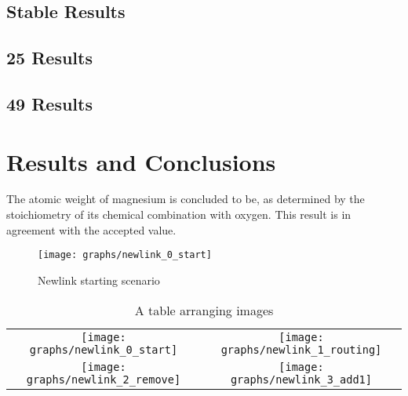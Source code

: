 \documentclass{article}
\begin{document}
\subsection{Stable Results}
\subsection{25 Results}
\subsection{49 Results}


\section{Results and Conclusions}

The atomic weight of magnesium is concluded to be, as determined by the stoichiometry of its chemical combination with oxygen. This result is in agreement with the accepted value.

\begin{figure}[htbp]
\begin{center}
\texttt{[image: graphs/newlink\_0\_start]} %
\caption{Newlink starting scenario}
\end{center}
\end{figure}

\begin{table}[ht]
\caption{A table arranging  images}
\centering
\begin{tabular}{cc}
\texttt{[image: graphs/newlink\_0\_start]}&\texttt{[image: graphs/newlink\_1\_routing]}\\
 
\texttt{[image: graphs/newlink\_2\_remove]}&\texttt{[image: graphs/newlink\_3\_add1]}\\
\end{tabular}
\label{tab:gqwt}
\end{table}


\end{document}
